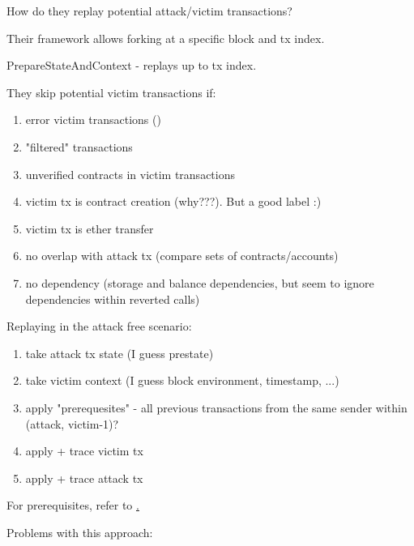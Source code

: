 \documentclass[draft,final]{vutinfth} %
\begin{document}
    How do they replay potential attack/victim transactions?

    Their framework allows forking at a specific block and tx index.

    PrepareStateAndContext - replays up to tx index.


    They skip potential victim transactions if:

    \begin{enumerate}
        \item error victim transactions ()
        \item "filtered" transactions 
        \item unverified contracts in victim transactions
        \item victim tx is contract creation (why???). But a good label :)
        \item victim tx is ether transfer
        \item no overlap with attack tx (compare sets of contracts/accounts)
        \item no dependency (storage and balance dependencies, but seem to ignore dependencies within reverted calls)
    \end{enumerate}

    Replaying in the attack free scenario:

    \begin{enumerate}
        \item take attack tx state (I guess prestate)
        \item take victim context (I guess block environment, timestamp, ...)
        \item apply "prerequesites" - all previous transactions from the same sender within (attack, victim-1)?
        \item apply + trace victim tx
        \item apply + trace attack tx
    \end{enumerate}

    For prerequisites, refer to \href{https://github.com/Troublor/erebus-redgiant/blob/4544163f0c6a369b35c3237851f482d240fa7bbd/dataset/tx_history_test.go#L42-L53}.

    Problems with this approach:
\end{document}
